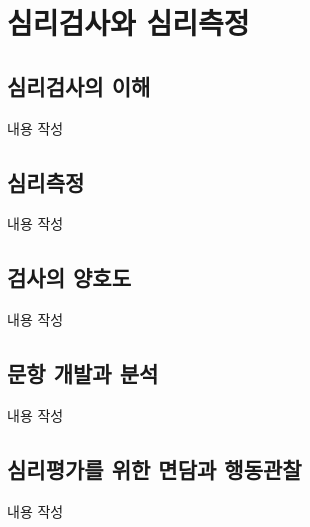 \section{심리검사와 심리측정}

\subsection{심리검사의 이해}
내용 작성

\subsection{심리측정}
내용 작성

\subsection{검사의 양호도}
내용 작성

\subsection{문항 개발과 분석}
내용 작성

\subsection{심리평가를 위한 면담과 행동관찰}
내용 작성
